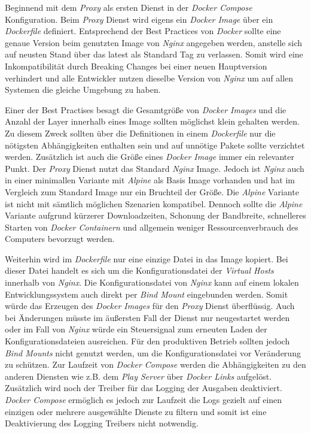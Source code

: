 Beginnend mit dem \textit{Proxy} als ersten Dienst in der \textit{Docker Compose} Konfiguration. Beim \textit{Proxy} Dienst wird eigens ein \textit{Docker Image} über ein \textit{Dockerfile} definiert. Entsprechend der Best Practices von \textit{Docker} sollte eine genaue Version beim genutzten Image von \textit{Nginx} angegeben werden, anstelle sich auf neusten Stand über das latest als Standard Tag zu verlassen. Somit wird eine Inkompatibilität durch Breaking Changes bei einer neuen Hauptversion verhindert und alle Entwickler nutzen dieselbe Version von \textit{Nginx} um auf allen Systemen die gleiche Umgebung zu haben.

Einer der Best Practises besagt die Gesamtgröße von \textit{Docker Images} und die Anzahl der Layer innerhalb eines Image sollten möglichst klein gehalten werden. Zu diesem Zweck sollten über die Definitionen in einem \textit{Dockerfile} nur die nötigsten Abhängigkeiten enthalten sein und auf unnötige Pakete sollte verzichtet werden. Zusätzlich ist auch die Größe eines \textit{Docker Image} immer ein relevanter Punkt. Der \textit{Proxy} Dienst nutzt das Standard \textit{Nginx} Image. Jedoch ist \textit{Nginx} auch in einer minimallen Variante mit \textit{Alpine} als Basis Image vorhanden und hat im Vergleich zum Standard Image nur ein Bruchteil der Größe. Die \textit{Alpine} Variante ist nicht mit sämtlich möglichen Szenarien kompatibel. Dennoch sollte die \textit{Alpine} Variante aufgrund kürzerer Downloadzeiten, Schonung der Bandbreite, schnelleres Starten von \textit{Docker Containern} und allgemein weniger Ressourcenverbrauch des Computers bevorzugt werden.

Weiterhin wird im \textit{Dockerfile} nur eine einzige Datei in das Image kopiert. Bei dieser Datei handelt es sich um die Konfigurationsdatei der \textit{Virtual Hosts} innerhalb von \textit{Nginx}. Die Konfigurationsdatei von \textit{Nginx} kann auf einem lokalen Entwicklungssystem auch direkt per \textit{Bind Mount} eingebunden werden. Somit würde das Erzeugen des \textit{Docker Images} für den \textit{Proxy} Dienst überflüssig. Auch bei Änderungen müsste im äußersten Fall der Dienst nur neugestartet werden oder im Fall von \textit{Nginx} würde ein Steuersignal zum erneuten Laden der Konfigurationsdateien ausreichen. Für den produktiven Betrieb sollten jedoch \textit{Bind Mounts} nicht genutzt werden, um die Konfigurationsdatei vor Veränderung zu schützen. Zur Laufzeit von \textit{Docker Compose} werden die Abhängigkeiten zu den anderen Diensten wie z.B. dem \textit{Play Server} über \textit{Docker Links} aufgelöst. Zusätzlich wird noch der Treiber für das Logging der Ausgaben deaktiviert. \textit{Docker Compose} ermöglich es jedoch zur Laufzeit die Logs gezielt auf einen einzigen oder mehrere ausgewählte Dienste zu filtern und somit ist eine Deaktivierung des Logging Treibers nicht notwendig.

